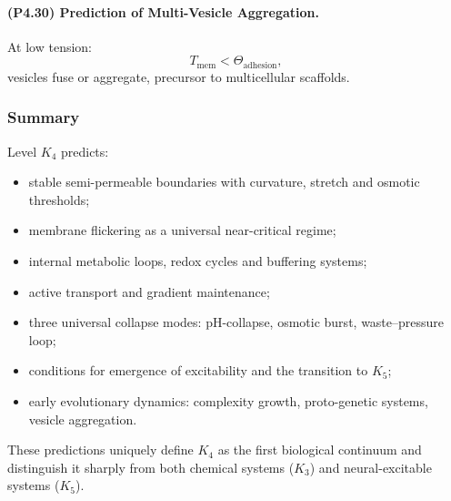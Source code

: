 \paragraph{(P4.30) Prediction of Multi-Vesicle Aggregation.}
At low tension:
\[
T_{\mathrm{mem}} < \Theta_{\mathrm{adhesion}},
\]
vesicles fuse or aggregate, precursor to multicellular scaffolds.

\subsubsection{Summary}

Level $K_4$ predicts:
\begin{itemize}
    \item stable semi-permeable boundaries with curvature, stretch and osmotic thresholds;
    \item membrane flickering as a universal near-critical regime;
    \item internal metabolic loops, redox cycles and buffering systems;
    \item active transport and gradient maintenance;
    \item three universal collapse modes: pH-collapse, osmotic burst, waste–pressure loop;
    \item conditions for emergence of excitability and the transition to $K_5$;
    \item early evolutionary dynamics: complexity growth, proto-genetic systems, vesicle aggregation.
\end{itemize}

These predictions uniquely define $K_4$ as the first biological continuum and
distinguish it sharply from both chemical systems ($K_3$) and neural-excitable
systems ($K_5$).
